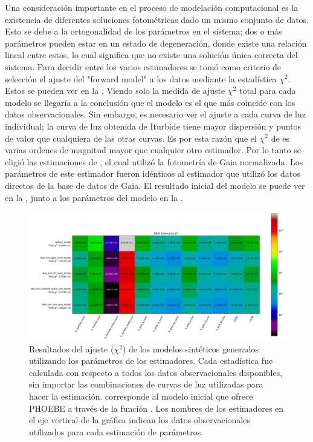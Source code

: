 Una consideración importante en el proceso de modelación computacional es la
existencia de diferentes soluciones fotométricas dado un mismo conjunto de
datos. Esto se debe a la ortogonalidad de los parámetros en el sistema; dos o
más parámetros pueden estar en un estado de degeneración, donde existe una
relación lineal entre estos, lo cual significa que no existe una solución única
correcta del sistema. Para decidir entre los varios estimadores se tomó como
criterio de selección el ajuste del "forward model" a los datos mediante la
estadística $\chi^2$. Estos se pueden ver en la .
Viendo solo la medida de ajuste $\chi^2$ total para cada modelo se llegaría a la
conclusión que el modelo  es el
que más coincide con los datos observacionales. Sin embargo, es necesario ver el
ajuste a cada curva de luz individual; la curva de luz obtenida de Iturbide
tiene mayor dispersión y puntos de valor que cualquiera de las otras curvas. Es
por esta razón que el $\chi^2$ de  es varias
ordenes de magnitud mayor que cualquier otro estimador. Por lo tanto se eligió
las estimaciones de , el cual utilizó la
fotometría de Gaia normalizada. Los parámetros de este estimador fueron
idénticos al estimador que utilizó los datos directos de la base de datos de
Gaia. El resultado inicial del modelo se puede ver en la
, junto a los parámetros del modelo en la
.

\begin{figure}[!ht]
	\centering
	\includegraphics[scale=0.4]{Metodologia/Secciones/ModeloComputacional/Figures/EstimadoresChiResultados.png}

	\caption{Resultados del ajuste ($\chi^2$) de los modelos sintéticos
		generados utilizando los parámetros de los estimadores. Cada estadística fue
		calculada con respecto a todos los datos observacionales disponibles, sin
		importar las combinaciones de curvas de luz utilizadas para hacer la
		estimación.  corresponde al modelo inicial que ofrece
		PHOEBE a través de la función . Los
		nombres de los estimadores en el eje vertical de la gráfica indican los
		datos observacionales utilizados para cada estimación de parámetros.}
	\label{chiSqrdFigure}
\end{figure}

